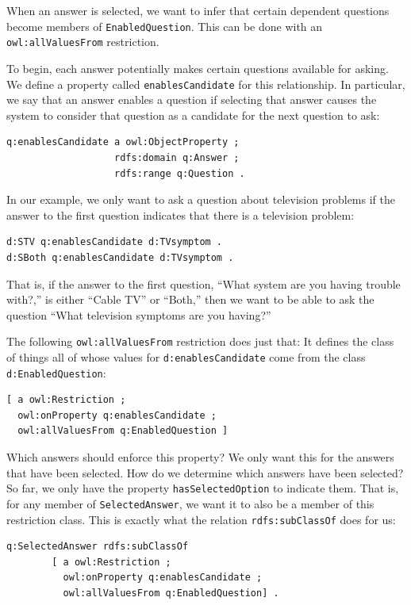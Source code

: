 When an answer is selected, we want to infer that certain dependent
questions become members of
\texttt{EnabledQuestion}. This can be done with an \texttt{owl:allValuesFrom} restriction.

To begin, each answer potentially makes certain questions available for
asking. We define a property called \texttt{enablesCandidate} for this
relationship. In particular, we say that an answer enables a question if
selecting that answer causes the system to consider that question as a
candidate for the next question to ask:

\begin{lstlisting}
q:enablesCandidate a owl:ObjectProperty ;
                   rdfs:domain q:Answer ;
                   rdfs:range q:Question .
\end{lstlisting}

In our example, we only want to ask a question about television problems
if the answer to the first question indicates that there is a television
problem:

\begin{lstlisting}
d:STV q:enablesCandidate d:TVsymptom .
d:SBoth q:enablesCandidate d:TVsymptom .
\end{lstlisting}

That is, if the answer to the first question, ``What system are you
having trouble with?,'' is either ``Cable TV'' or ``Both,'' then we want
to be able to ask the question ``What television symptoms are you
having?''

The following \texttt{owl:allValuesFrom} restriction does just that: It defines
the class of things all of
whose values for \texttt{d:enablesCandidate} come from the class
\texttt{d:EnabledQuestion}:

\begin{lstlisting}
[ a owl:Restriction ;
  owl:onProperty q:enablesCandidate ;
  owl:allValuesFrom q:EnabledQuestion ]
\end{lstlisting}

Which answers should enforce this property? We only want this for the
answers that have been selected. How do we determine which answers have
been selected? So far, we only have the property \texttt{hasSelectedOption} to
indicate them. That is, for any member of \texttt{SelectedAnswer}, we want it to
also be a member of this restriction class. This is exactly what the
relation \texttt{rdfs:subClassOf} does for us:

\begin{lstlisting}
q:SelectedAnswer rdfs:subClassOf
        [ a owl:Restriction ;
          owl:onProperty q:enablesCandidate ;
          owl:allValuesFrom q:EnabledQuestion] .
\end{lstlisting}

